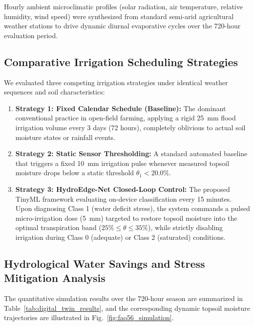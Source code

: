 Hourly ambient microclimatic profiles (solar radiation, air temperature, relative humidity, wind speed) were synthesized from standard semi-arid agricultural weather stations to drive dynamic diurnal evaporative cycles over the 720-hour evaluation period.

\subsection{Comparative Irrigation Scheduling Strategies}

We evaluated three competing irrigation strategies under identical weather sequences and soil characteristics:
\begin{enumerate}
    \item \textbf{Strategy 1: Fixed Calendar Schedule (Baseline):} The dominant conventional practice in open-field farming, applying a rigid 25~mm flood irrigation volume every 3 days (72 hours), completely oblivious to actual soil moisture states or rainfall events.
    \item \textbf{Strategy 2: Static Sensor Thresholding:} A standard automated baseline that triggers a fixed 10~mm irrigation pulse whenever measured topsoil moisture drops below a static threshold $\theta_1 < 20.0\%$.
    \item \textbf{Strategy 3: HydroEdge-Net Closed-Loop Control:} The proposed TinyML framework evaluating on-device classification every 15 minutes. Upon diagnosing Class 1 (water deficit stress), the system commands a pulsed micro-irrigation dose (5~mm) targeted to restore topsoil moisture into the optimal transpiration band ($25\% \le \theta \le 35\%$), while strictly disabling irrigation during Class 0 (adequate) or Class 2 (saturated) conditions.
\end{enumerate}

\subsection{Hydrological Water Savings and Stress Mitigation Analysis}

The quantitative simulation results over the 720-hour season are summarized in Table~\ref{tab:digital_twin_results}, and the corresponding dynamic topsoil moisture trajectories are illustrated in Fig.~\ref{fig:fao56_simulation}.

